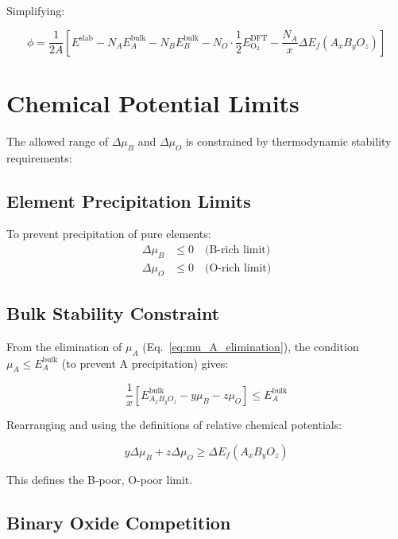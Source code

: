 \documentclass[11pt]{article}
\begin{document}
Simplifying:

\begin{equation}
\phi = \frac{1}{2A} \left[ E^{\text{slab}} - N_A E_A^{\text{bulk}} - N_B E_B^{\text{bulk}} - N_O \cdot \frac{1}{2} E_{\text{O}_2}^{\text{DFT}} - \frac{N_A}{x} \Delta E_f(A_xB_yO_z) \right]
\label{eq:phi_simplified}
\end{equation}

\section{Chemical Potential Limits}

The allowed range of $\Delta\mu_B$ and $\Delta\mu_O$ is constrained by thermodynamic stability requirements:

\subsection{Element Precipitation Limits}

To prevent precipitation of pure elements:
\begin{align}
\Delta\mu_B &\leq 0 \quad \text{(B-rich limit)} \label{eq:limit_B_rich} \\
\Delta\mu_O &\leq 0 \quad \text{(O-rich limit)} \label{eq:limit_O_rich}
\end{align}

\subsection{Bulk Stability Constraint}

From the elimination of $\mu_A$ (Eq.~\ref{eq:mu_A_elimination}), the condition $\mu_A \leq E_A^{\text{bulk}}$ (to prevent A precipitation) gives:

\begin{equation}
\frac{1}{x} \left[ E_{A_xB_yO_z}^{\text{bulk}} - y \mu_B - z \mu_O \right] \leq E_A^{\text{bulk}}
\end{equation}

Rearranging and using the definitions of relative chemical potentials:

\begin{equation}
y \Delta\mu_B + z \Delta\mu_O \geq \Delta E_f(A_xB_yO_z)
\label{eq:limit_A_precip}
\end{equation}

This defines the B-poor, O-poor limit.

\subsection{Binary Oxide Competition}
\end{document}

